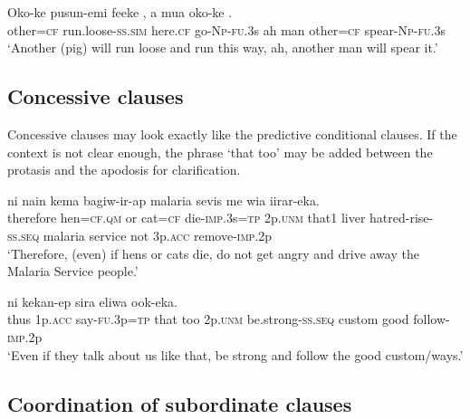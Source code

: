 \ea%
\label{ex:8:x1850}
\gll Oko-ke  pusun-emi  feeke  \textstyleEmphasizedVernacularWords{-}\textstyleEmphasizedVernacularWords{-},  a  mua oko-ke  \textstyleEmphasizedVernacularWords{-}\textstyleEmphasizedVernacularWords{-}.\\
other=\textsc{cf} run.loose-\textsc{ss}.\textsc{sim} here.\textsc{cf}  go-\textsc{Np}-\textsc{fu}.3s ah man other=\textsc{cf} spear-\textsc{Np}-\textsc{fu}.3s\\
\glt`Another (pig) will run loose and run this way, ah, another man will spear it.'
\z
{}


\subsection{Concessive clauses}

Concessive clauses may look exactly like the predictive conditional clauses. If the context is not clear enough, the phrase  `that too' may be added between the protasis and the apodosis for clarification.  

\ea%
\label{ex:8:x1655}
\gll [Naapeya aara=ki e kasi=ke um-inok=na] ni nain kema bagiw-ir-ap  malaria sevis me wia iirar-eka.\\
therefore hen=\textsc{cf}.\textsc{qm} or cat=\textsc{cf} die-\textsc{imp}.3s=\textsc{tp} 2p.\textsc{unm} that1 liver hatred-rise-\textsc{ss}.\textsc{seq} malaria  service  not 3p.\textsc{acc} remove-\textsc{imp}.2p\\
\glt`Therefore, (even) if hens or cats die, do not get angry and drive away the Malaria Service people.'
\z


\ea%
\label{ex:8:x1430}
\gll [Naap  yia  ma-ikuan=na]      ni  kekan-ep sira  eliwa  ook-eka.\\
thus  1p.\textsc{acc} say-\textsc{fu}.3p=\textsc{tp} that too 2p.\textsc{unm} be.strong-\textsc{ss}.\textsc{seq} custom good follow-\textsc{imp}.2p\\
\glt`Even if they talk about us like that, be strong and follow the good custom/ways.'
\z


\subsection{Coordination of subordinate clauses} 

